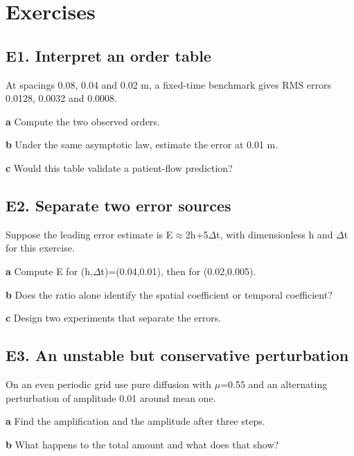 \documentclass[11pt,letterpaper]{article}
\theoremstyle{definition}\newtheorem{definition}{Definition}\newtheorem{example}{Example}
\numberwithin{equation}{section}
\begin{document}
\section*{Exercises}
\par\noindent\begin{minipage}{\linewidth}
\subsection*{E1. Interpret an order table}
At spacings 0.08, 0.04 and 0.02 m, a fixed-time benchmark gives RMS errors 0.0128, 0.0032 and 0.0008.

\textbf{a} Compute the two observed orders.

\end{minipage}\par\medskip
\textbf{b} Under the same asymptotic law, estimate the error at 0.01 m.

\textbf{c} Would this table validate a patient-flow prediction?

\par\noindent\begin{minipage}{\linewidth}
\subsection*{E2. Separate two error sources}
Suppose the leading error estimate is E$\approx$2h+\allowbreak{}5$\Delta$t, with dimensionless h and $\Delta$t for this exercise.

\textbf{a} Compute E for (h,$\Delta$t)=\allowbreak{}(0.04,0.01), then for (0.02,0.005).

\end{minipage}\par\medskip
\textbf{b} Does the ratio alone identify the spatial coefficient or temporal coefficient?

\textbf{c} Design two experiments that separate the errors.

\par\noindent\begin{minipage}{\linewidth}
\subsection*{E3. An unstable but conservative perturbation}
On an even periodic grid use pure diffusion with $\mu$=\allowbreak{}0.55 and an alternating perturbation of amplitude 0.01 around mean one.

\textbf{a} Find the amplification and the amplitude after three steps.

\end{minipage}\par\medskip
\textbf{b} What happens to the total amount and what does that show?
\end{document}
